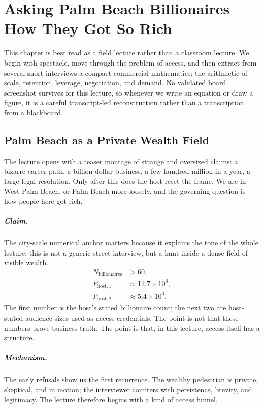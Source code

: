 \chapter{Asking Palm Beach Billionaires How They Got So Rich}

This chapter is best read as a field lecture rather than a classroom lecture. We begin with spectacle, move through the problem of access, and then extract from several short interviews a compact commercial mathematics: the arithmetic of scale, retention, leverage, negotiation, and demand. No validated board screenshot survives for this lecture, so whenever we write an equation or draw a figure, it is a careful transcript-led reconstruction rather than a transcription from a blackboard.

\section{Palm Beach as a Private Wealth Field}

The lecture opens with a teaser montage of strange and oversized claims: a bizarre career path, a billion-dollar business, a few hundred million in a year, a large legal resolution. Only after this does the host reset the frame. We are in West Palm Beach, or Palm Beach more loosely, and the governing question is how people here got rich.

\paragraph{Claim.} The city-scale numerical anchor matters because it explains the tone of the whole lecture: this is not a generic street interview, but a hunt inside a dense field of visible wealth.
\begin{align}
N_{\mathrm{billionaires}} &> 60,\\
F_{\mathrm{host},1} &\approx 12.7\times 10^6,\\
F_{\mathrm{host},2} &\approx 5.4\times 10^6.
\end{align}
The first number is the host's stated billionaire count; the next two are host-stated audience sizes used as access credentials. The point is not that these numbers prove business truth. The point is that, in this lecture, access itself has a structure.

\paragraph{Mechanism.} The early refusals show us the first recurrence. The wealthy pedestrian is private, skeptical, and in motion; the interviewer counters with persistence, brevity, and legitimacy. The lecture therefore begins with a kind of access funnel.

